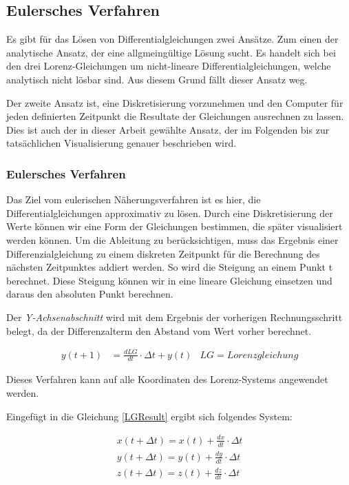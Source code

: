 \subsection{Eulersches Verfahren}
Es gibt für das Lösen von Differentialgleichungen zwei Ansätze. Zum einen der analytische Ansatz, der eine allgmeingültige Lösung sucht. Es handelt sich bei den drei Lorenz-Gleichungen um nicht-lineare Differentialgleichungen, welche analytisch nicht lösbar sind. Aus diesem Grund fällt dieser Ansatz weg. 

Der zweite Ansatz ist, eine Diskretisierung vorzunehmen und den Computer für jeden definierten Zeitpunkt die Resultate der Gleichungen ausrechnen zu lassen. Dies ist auch der in dieser Arbeit gewählte Ansatz, der im Folgenden bis zur tatsächlichen Visualisierung genauer beschrieben wird. 

\subsubsection{Eulersches Verfahren}

Das Ziel vom eulerischen Näherungsverfahren ist es hier, die Differentialgleichungen approximativ zu lösen. Durch eine Diskretisierung der Werte können wir eine Form der Gleichungen bestimmen, die später visualisiert werden können. Um die Ableitung zu berücksichtigen, muss das Ergebnis einer Differenzialgleichung zu einem diskreten Zeitpunkt für die Berechnung des nächsten Zeitpunktes addiert werden. So wird die Steigung an einem Punkt t berechnet. Diese Steigung können wir in eine lineare Gleichung einsetzen und daraus den absoluten Punkt berechnen.

Der \textit{Y-Achsenabschnitt} wird mit dem Ergebnis der vorherigen Rechnungsschritt belegt, da der Differenzalterm den Abstand vom Wert vorher berechnet.  

\begin{align}
\label{LGResult}
y(t + 1) &= \frac{d LG}{d t} \cdot  \Delta t + y(t) & LG = Lorenzgleichung
\end{align}

Dieses Verfahren kann auf alle Koordinaten des Lorenz-Systems angewendet werden.

Eingefügt in die Gleichung \eqref{LGResult} ergibt sich folgendes System:

\begin{align}
x(t+\Delta t) = x(t) + \frac{dx}{dt} \cdot \Delta t\\
y(t + \Delta t) = y(t) + \frac{dy}{dt} \cdot \Delta t\\
z(t + \Delta t) = z(t) + \frac{dz}{dt} \cdot \Delta t
\end{align}

